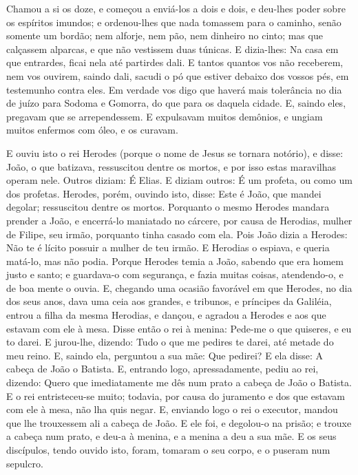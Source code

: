 Chamou a si os doze, e começou a enviá-los a dois e dois, e
deu-lhes poder sobre os espíritos imundos; e ordenou-lhes que
nada tomassem para o caminho, senão somente um bordão; nem alforje,
nem pão, nem dinheiro no cinto; mas que calçassem alparcas, e
que não vestissem duas túnicas. E dizia-lhes: Na casa em que
entrardes, ficai nela até partirdes dali. E tantos quantos
vos não receberem, nem vos ouvirem, saindo dali, sacudi o pó que
estiver debaixo dos vossos pés, em testemunho contra eles. Em
verdade vos digo que haverá mais tolerância no dia de juízo para
Sodoma e Gomorra, do que para os daquela cidade. E, saindo
eles, pregavam que se arrependessem. E expulsavam muitos
demônios, e ungiam muitos enfermos com óleo, e os curavam.

E ouviu isto o rei Herodes (porque o nome de Jesus se tornara
notório), e disse: João, o que batizava, ressuscitou dentre os
mortos, e por isso estas maravilhas operam nele. Outros
diziam: É Elias. E diziam outros: É um profeta, ou como um dos
profetas. Herodes, porém, ouvindo isto, disse: Este é João,
que mandei degolar; ressuscitou dentre os mortos. Porquanto o
mesmo Herodes mandara prender a João, e encerrá-lo maniatado no
cárcere, por causa de Herodias, mulher de Filipe, seu irmão,
porquanto tinha casado com ela. Pois João dizia a Herodes:
Não te é lícito possuir a mulher de teu irmão. E Herodias o
espiava, e queria matá-lo, mas não podia. Porque Herodes
temia a João, sabendo que era homem justo e santo; e guardava-o com
segurança, e fazia muitas coisas, atendendo-o, e de boa mente o
ouvia. E, chegando uma ocasião favorável em que Herodes, no
dia dos seus anos, dava uma ceia aos grandes, e tribunos, e
príncipes da Galiléia, entrou a filha da mesma Herodias, e
dançou, e agradou a Herodes e aos que estavam com ele à mesa. Disse
então o rei à menina: Pede-me o que quiseres, e eu to darei.
E jurou-lhe, dizendo: Tudo o que me pedires te darei, até
metade do meu reino. E, saindo ela, perguntou a sua mãe: Que
pedirei? E ela disse: A cabeça de João o Batista. E, entrando
logo, apressadamente, pediu ao rei, dizendo: Quero que imediatamente
me dês num prato a cabeça de João o Batista. E o rei
entristeceu-se muito; todavia, por causa do juramento e dos que
estavam com ele à mesa, não lha quis negar. E, enviando logo
o rei o executor, mandou que lhe trouxessem ali a cabeça de João. E
ele foi, e degolou-o na prisão; e trouxe a cabeça num prato,
e deu-a à menina, e a menina a deu a sua mãe. E os seus
discípulos, tendo ouvido isto, foram, tomaram o seu corpo, e o
puseram num sepulcro.

